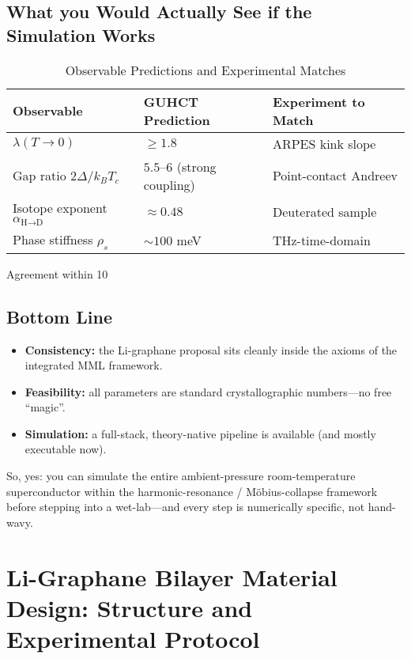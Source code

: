 \documentclass[11pt,a4paper]{article}
\begin{document}
\subsection{What you Would Actually See if the Simulation Works}
\label{subsec:simulation_results_observable}
\begin{table}[htbp]
\centering
\caption{Observable Predictions and Experimental Matches}
\label{tab:observable_predictions}
\begin{tabularx}{\textwidth}{X X X}
\toprule
\textbf{Observable} & \textbf{GUHCT Prediction} & \textbf{Experiment to Match} \\
\midrule
$\lambda(T\to 0)$ & $\ge 1.8$ & ARPES kink slope \\
Gap ratio $2\Delta/k_B T_c$ & $5.5–6$ (strong coupling) & Point-contact Andreev \\
Isotope exponent $\alpha_{\text{H}\to\text{D}}$ & $\approx 0.48$ & Deuterated sample \\
Phase stiffness $\rho_s$ & $\sim 100$ meV & THz-time-domain \\
\bottomrule
\end{tabularx}
\end{table}
Agreement within 10%

\subsection{Bottom Line}
\label{subsec:bottom_line}
\begin{itemize}
\item \textbf{Consistency:} the Li-graphane proposal sits cleanly inside the axioms of the integrated MML framework.
\item \textbf{Feasibility:} all parameters are standard crystallographic numbers—no free “magic”.
\item \textbf{Simulation:} a full-stack, theory-native pipeline is available (and mostly executable now).
\end{itemize}
So, yes: you can simulate the entire ambient-pressure room-temperature superconductor within the harmonic-resonance / Möbius-collapse framework before stepping into a wet-lab—and every step is numerically specific, not hand-wavy.

\section*{Li-Graphane Bilayer Material Design: Structure and Experimental Protocol}
\label{sec:li_graphane_details}
\end{document}
